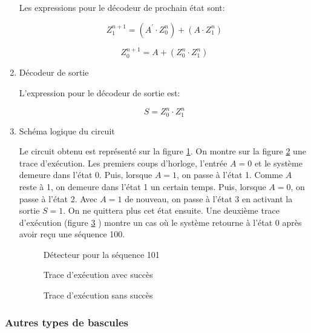 \documentclass[11pt]{article}
\begin{document}
\begin{enumerate}
Les expressions pour le décodeur de prochain état sont:

$$ Z_1^{n+1} = (A^\prime \cdot Z_0^{n}) + (A \cdot  Z_1^{n}) $$

$$ Z_0^{n+1} = A + (Z_0^{n} \cdot Z_1^{n}) $$

\item Décodeur de sortie
\label{sec:org3c306aa}

L'expression pour le décodeur de sortie est:

$$ S = Z_0^{n} \cdot Z_1^{n} $$

\item Schéma logique du circuit
\label{sec:org0b65545}

Le circuit obtenu est représenté sur la figure
\ref{fig:orgd2fe0e8}. On montre sur la figure
\ref{fig:orgb22e567} une trace d'exécution. Les premiers coups
d'horloge, l'entrée \(A=0\) et le système demeure dans l'état 0. Puis,
lorsque \(A=1\), on passe à l'état 1. Comme \(A\) reste à 1, on
demeure dans l'état 1 un certain temps. Puis, lorsque \(A=0\), on
passe à l'état 2. Avec \(A=1\) de nouveau, on passe à l'état 3 en
activant la sortie \(S=1\). On ne quittera plus cet état ensuite. Une
deuxième trace d'exécution (figure \ref{fig:org6f16823} ) montre
un cas où le système retourne à l'état 0 après avoir reçu une
séquence 100.

\begin{figure}[htbp]
\centering

\caption{\label{fig:orgd2fe0e8}Détecteur pour la séquence 101}
\end{figure}

\begin{figure}[htbp]
\centering

\caption{\label{fig:orgb22e567}Trace d'exécution avec succès}
\end{figure}

\begin{figure}[htbp]
\centering

\caption{\label{fig:org6f16823}Trace d'exécution sans succès}
\end{figure}
\end{enumerate}

\subsubsection{Autres types de bascules}
\label{sec:org4d1f11f}
\end{document}
